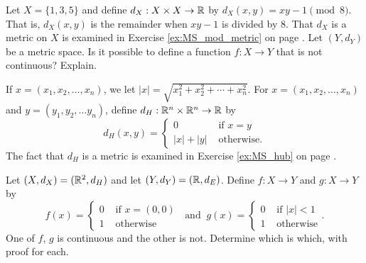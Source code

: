 \item Let $X = \{1,3,5\}$ and define $d_X: X \times X \to \mathbb{R}$ by $d_X(x,y) = xy - 1 \pmod{8}$. That is, $d_X(x,y)$ is the remainder when $xy - 1$ is divided by $8$. That $d_X$ is a metric on $X$ is examined in Exercise \ref{ex:MS_mod_metric} on page \pageref{ex:MS_mod_metric}. Let $(Y,d_Y)$ be a metric space. Is it possible to define a function $f: X \to Y$ that is not continuous? Explain. 

\begin{comment}

\ExerciseSolution Recall that $d_X$ has values as in Table \ref{T:open_balls_example_8}.
\begin{table}[h]
\begin{center}
\begin{tabular}{|c|c|c|c|} \hline
	&$1$	&$3$	&$5$	\\ \hline
$1$	&$0$	&$2$	&$4$	\\ \hline
$3$	&$2$	&$0$	&$6$	\\ \hline
$5$	&$4$	&$6$	&$0$	\\ \hline
\end{tabular}
\caption{Values of $d_X$.}
\label{T:open_balls_example_8}
\end{center}	
\end{table}
Notice that $B(x,1) = \{x\}$ for every $x \in X$. So if $f: X \to Y$ is a function and $N$ is a neighborhood of $f(x)$ in $Y$, then $B(x,1) \subseteq f^{-1}(N)$. So $f^{-1}(N)$ is a neighborhood of $x$ for every $x \in X$ and $f$ must be a continuous function. 

\end{comment}
	

\item If $x = (x_1, x_2, \ldots, x_n)$, we let $|x| = \sqrt{x_1^2+x_2^2+ \cdots + x_n^2}$. For $x = (x_1, x_2, \ldots, x_n)$ and $y = (y_1, y_2, \ldots y_n)$, define $d_H: \mathbb{R}^n \times \mathbb{R}^n \to \mathbb{R}$ by 
\[d_H(x,y) = \begin{cases} 0 &\text{ if } x=y \\ |x|+|y| &\text{ otherwise}. \end{cases}\]
The fact that $d_H$ is a metric is examined in Exercise \ref{ex:MS_hub} on page \pageref{ex:MS_hub}. 

Let $(X,d_X) = (\mathbb{R}^2, d_H)$ and let $(Y,d_Y) = (\mathbb{R}, d_E)$. Define $f: X \to Y$ and $g: X \to Y$ by 
\[f(x) = \begin{cases} 0 &\text{ if } x = (0,0) \\ 1 &\text{ otherwise} \end{cases} \  \text{ and } \ g(x) = \begin{cases} 0 &\text{ if } |x|<1 \\ 1 &\text{ otherwise} \end{cases}.\]
One of $f$, $g$ is continuous and the other is not. Determine which is which, with proof for each. 

